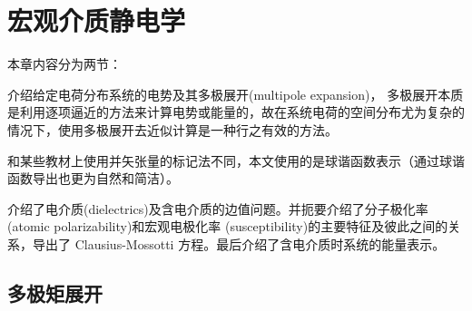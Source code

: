 \chapter{宏观介质静电学}
\label{chap:electrostatics of macroscopic media}

本章内容分为两节：
\begin{compactenum}
    \item {}介绍给定电荷分布系统的电势及其多极展开(multipole expansion)，%
    多极展开本质是利用逐项逼近的方法来计算电势或能量的，故在系统电荷的空间分布尤为复杂的情况下，使用多极展开去近似计算是一种行之有效的方法。
    
    和某些教材上使用并矢张量的标记法不同，本文使用的是球谐函数表示（通过球谐函数导出也更为自然和简洁）。

    \item {}介绍了电介质(dielectrics)及含电介质的边值问题。并扼要介绍了分子极化率(atomic polarizability)和宏观电极化率 (susceptibility)的主要特征及彼此之间的关系，导出了 Clausius-Mossotti 方程。最后介绍了含电介质时系统的能量表示。
\end{compactenum}

\section{多极矩展开}
\label{sec:multipole expansion}

